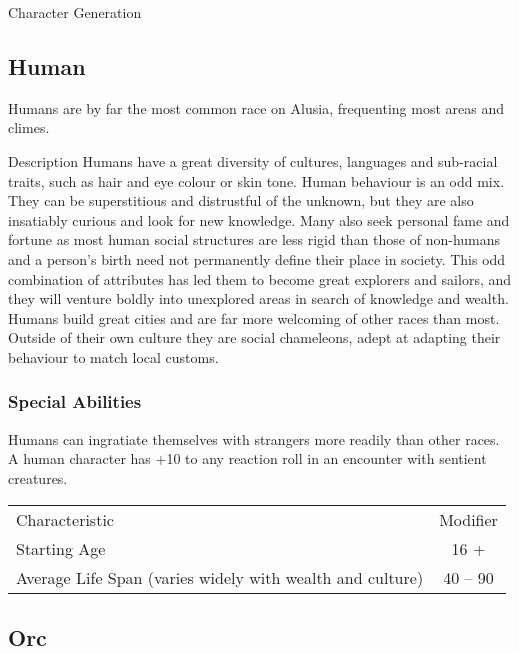 \begin{Chapter}{Character Generation}
\subsection{Human}

Humans are by far the most common race on Alusia, frequenting most
areas and climes.

\begin{Description}
\item[Description] Humans have a great diversity of cultures,
  languages and sub-racial traits, such as hair and eye colour or skin
  tone. Human behaviour is an odd mix.  They can be superstitious and
  distrustful of the unknown, but they are also insatiably curious and
  look for new knowledge.  Many also seek personal fame and fortune as
  most human social structures are less rigid than those of non-humans
  and a person’s birth need not permanently define their place in
  society.  This odd combination of attributes has led them to become
  great explorers and sailors, and they will venture boldly into
  unexplored areas in search of knowledge and wealth. Humans build
  great cities and are far more welcoming of other races than most.
  Outside of their own culture they are social chameleons, adept at
  adapting their behaviour to match local customs.
\end{Description}

\subsubsection{Special Abilities}

\begin{Enumerate}

\item Humans can ingratiate themselves with strangers more readily
  than other races.  A human character has +10 to any reaction roll in
  an encounter with sentient creatures.

\end{Enumerate}

\begin{tabularx}{\columnwidth}{Xc}
Characteristic				& Modifier \\
Starting Age				& 16 + \\
Average Life Span (varies widely with wealth and culture) & 40 -- 90 \\
\end{tabularx}

\subsection{Orc}


\end{Chapter}
